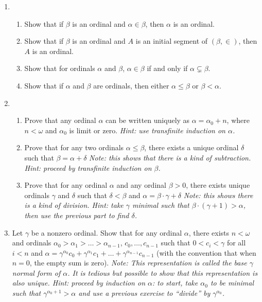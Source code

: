 \documentclass{amsart}
\theoremstyle{definition}
\begin{document}
\begin{enumerate}
\item \begin{enumerate}
\item Show that if $\beta$ is an ordinal and $\alpha \in \beta$, then $\alpha$ is an ordinal.
\item Show that if $\beta$ is an ordinal and $A$ is an initial segment of $(\beta, \in)$, then $A$ is an ordinal.
\item Show that for ordinals $\alpha$ and $\beta$, $\alpha \in \beta$ if and only if $\alpha \subsetneq \beta$.
\item Show that if $\alpha$ and $\beta$ are ordinals, then either $\alpha \le \beta$ or $\beta < \alpha$.
\end{enumerate}
\item \begin{enumerate}
\item Prove that any ordinal $\alpha$ can be written uniquely as $\alpha = \alpha_0 + n$, where $n < \omega$ and $\alpha_0$ is limit or zero. \emph{Hint: use transfinite induction on $\alpha$.}
\item Prove that for any two ordinals $\alpha \le \beta$, there exists a unique ordinal $\delta$ such that $\beta = \alpha + \delta$ \emph{Note: this shows that there is a kind of subtraction. Hint: proceed by transfinite induction on $\beta$.}
\item Prove that for any ordinal $\alpha$ and any ordinal $\beta > 0$, there exists unique ordinals $\gamma$ and $\delta$ such that $\delta < \beta$ and $\alpha = \beta \cdot \gamma + \delta$ \emph{Note: this shows there is a kind of division. Hint: take $\gamma$ minimal such that $\beta \cdot (\gamma + 1) > \alpha$, then use the previous part to find $\delta$.} 
\end{enumerate}
\item Let $\gamma$ be a nonzero ordinal. Show that for any ordinal $\alpha$, there exists $n < \omega$ and ordinals $\alpha_0 > \alpha_1 > \ldots > \alpha_{n - 1}$, $c_0, \ldots, c_{n - 1}$ such that $0 < c_i < \gamma$ for all $i < n$ and $\alpha = \gamma^{\alpha_0} c_0 + \gamma^{\alpha_1} c_1 + \ldots + \gamma^{\alpha_{n - 1}}c_{n - 1}$ (with the convention that when $n = 0$, the empty sum is zero). \emph{Note: This representation is called the base $\gamma$ normal form of $\alpha$. It is tedious but possible to show that this representation is also unique. Hint: proceed by induction on $\alpha$: to start, take $\alpha_0$ to be minimal such that $\gamma^{\alpha_0 + 1} > \alpha$ and use a previous exercise to ``divide'' by $\gamma^{\alpha_0}$.}

\end{enumerate}
\end{document}
